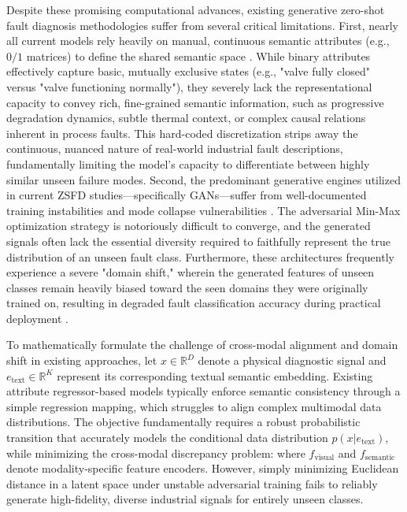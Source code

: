 Despite these promising computational advances, existing generative zero-shot fault diagnosis \cite{precup2015overview} methodologies suffer from several critical limitations. First, nearly all current models rely heavily on manual, continuous semantic attributes (e.g., $0/1$ matrices) to define the shared semantic space \cite{feng2021fault}. While binary attributes effectively capture basic, mutually exclusive states (e.g., "valve fully closed" versus "valve functioning normally"), they severely lack the representational capacity to convey rich, fine-grained semantic information, such as progressive degradation dynamics, subtle thermal context, or complex causal relations inherent in process faults. This hard-coded discretization strips away the continuous, nuanced nature of real-world industrial fault descriptions, fundamentally limiting the model's capacity to differentiate between highly similar unseen failure modes. Second, the predominant generative engines utilized in current ZSFD studies—specifically GANs—suffer from well-documented training instabilities and mode collapse vulnerabilities \cite{arjovsky2017wasserstein} \cite{wang2020deep}. The adversarial Min-Max optimization strategy is notoriously difficult to converge, and the generated signals often lack the essential diversity required to faithfully represent the true distribution of an unseen fault class. Furthermore, these architectures frequently experience a severe "domain shift," \cite{tzeng2017adversarial,long2015learning,zhang2023domain} wherein the generated features of unseen classes remain heavily biased toward the seen domains they were originally trained on, resulting in degraded fault classification accuracy during practical deployment \cite{wang2020deep}.

To mathematically formulate the challenge of cross-modal alignment and domain shift in existing approaches, let $x \in \mathbb{R}^D$ denote a physical diagnostic signal and $e_{\text{text}} \in \mathbb{R}^K$ represent its corresponding textual semantic embedding. Existing attribute regressor-based models typically enforce semantic consistency through a simple regression mapping, which struggles to align complex multimodal data distributions. The objective fundamentally requires a robust probabilistic transition that accurately models the conditional data distribution $p(x | e_{\text{text}})$, while minimizing the cross-modal discrepancy problem:
where $f_{\text{visual}}$ and $f_{\text{semantic}}$ denote modality-specific feature encoders. However, simply minimizing Euclidean distance in a latent space under unstable adversarial training fails to reliably generate high-fidelity, diverse industrial signals for entirely unseen classes.

